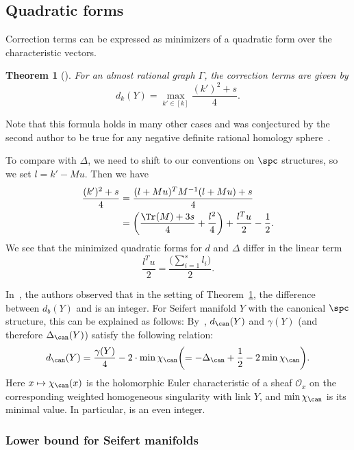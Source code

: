\documentclass[10pt,a4paper]{amsart}
\newcounter{theorem}
\newtheorem{Theorem}{Theorem}[section]
\begin{document}
\subsection{Quadratic forms}

Correction terms can be expressed as minimizers of a quadratic form over the characteristic vectors.

\begin{Theorem}[{\cite{Nem05}}]\label{thm:cor_terms} For an almost rational graph $\Gamma$, the correction terms are given by
 \[
 d_k(Y) = \max_{k' \in [k]} \frac{(k')^2+s}{4}.
 \]
\end{Theorem}
Note that this formula holds in many other cases and was conjectured by the second author to be true for any negative definite rational homology sphere~\cite{Nemethi_lattice08}.

To compare with $\Delta$, we need to shift to our conventions on $\spc$ structures, so we set $l = k' - Mu$. Then we have
 \begin{align*}
 \frac{(k')^2+s}{4} &= \frac{(l + Mu)^T M^{-1}(l + Mu) + s}{4}\\
 &= \biggl(\frac{\Tr(M) +3s}{4} + \frac{l^2}{4} \biggr) + \frac{l^T u}{2} - \frac12.
 \end{align*}
We see that the minimized quadratic forms for $d$ and $\Delta$ differ in the linear term
\[
\frac{l^T u}{2}= \frac{\bigl(\sum_{i=1}^s l_i\bigr)}{2}.
\]

\begin{Remark}
 In~\cite{GPP21}, the authors observed that in the setting of Theorem~\ref{thm:cor_terms}, the difference between $d_b(Y)$ and  is an integer. For Seifert manifold $Y$ with the canonical $\spc$ structure, this can be explained as follows:
 By~\cite[Section~11.7.2]{Nem22},
 $d_{\can}(Y)$ and $\gamma(Y)$ (and therefore $\Delta_{\can}(Y)$) satisfy the following relation:
 \begin{equation*}
 d_{\can}(Y)=\frac{\gamma(Y)}{4} - 2\cdot \min\chi_{\can} \biggl( = -\Delta_{\can} + \frac12 - 2 \min \chi_{\can} \biggr).
 \end{equation*}
 Here $x\mapsto \chi_{\can}(x)$ is the holomorphic Euler characteristic of a sheaf $\mathcal{O}_x$ on the corresponding weighted homogeneous singularity with link $Y$, and $\min\chi_{\can}$ is its minimal value. In particular,
  is an even integer.
\end{Remark}

\subsubsection{Lower bound for Seifert manifolds}
\end{document}
